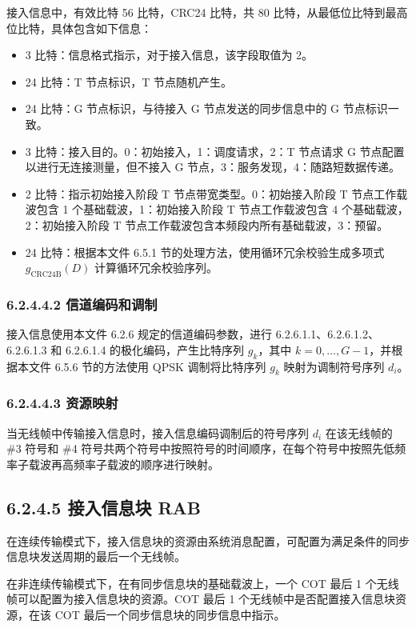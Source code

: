 \documentclass[11pt,a4paper]{ctexart}
\begin{document}
接入信息中，有效比特 56 比特，CRC24 比特，共 80 比特，从最低位比特到最高位比特，具体包含如下信息：
\begin{itemize}[nosep]
  \item 3 比特：信息格式指示，对于接入信息，该字段取值为 2。
  \item 24 比特：T 节点标识，T 节点随机产生。
  \item 24 比特：G 节点标识，与待接入 G 节点发送的同步信息中的 G 节点标识一致。
  \item 3 比特：接入目的。0：初始接入，1：调度请求，2：T 节点请求 G 节点配置以进行无连接测量，但不接入 G 节点，3：服务发现，4：随路短数据传递。
  \item 2 比特：指示初始接入阶段 T 节点带宽类型。0：初始接入阶段 T 节点工作载波包含 1 个基础载波，1：初始接入阶段 T 节点工作载波包含 4 个基础载波，2：初始接入阶段 T 节点工作载波包含本频段内所有基础载波，3：预留。
  \item 24 比特：根据本文件 6.5.1 节的处理方法，使用循环冗余校验生成多项式 $g_{\mathrm{CRC24B}}(D)$ 计算循环冗余校验序列。
\end{itemize}

\subsubsection{6.2.4.4.2 信道编码和调制}

接入信息使用本文件 6.2.6 规定的信道编码参数，进行 6.2.6.1.1、6.2.6.1.2、6.2.6.1.3 和 6.2.6.1.4 的极化编码，产生比特序列 $g_k$，其中 $k = 0, \ldots, G-1$，并根据本文件 6.5.6 节的方法使用 QPSK 调制将比特序列 $g_k$ 映射为调制符号序列 $d_i$。

\subsubsection{6.2.4.4.3 资源映射}

当无线帧中传输接入信息时，接入信息编码调制后的符号序列 $d_i$ 在该无线帧的 \#3 符号和 \#4 符号共两个符号中按照符号的时间顺序，在每个符号中按照先低频率子载波再高频率子载波的顺序进行映射。

\subsection{6.2.4.5 接入信息块 RAB}

在连续传输模式下，接入信息块的资源由系统消息配置，可配置为满足条件的同步信息块发送周期的最后一个无线帧。

在非连续传输模式下，在有同步信息块的基础载波上，一个 COT 最后 1 个无线帧可以配置为接入信息块的资源。COT 最后 1 个无线帧中是否配置接入信息块资源，在该 COT 最后一个同步信息块的同步信息中指示。
\end{document}
